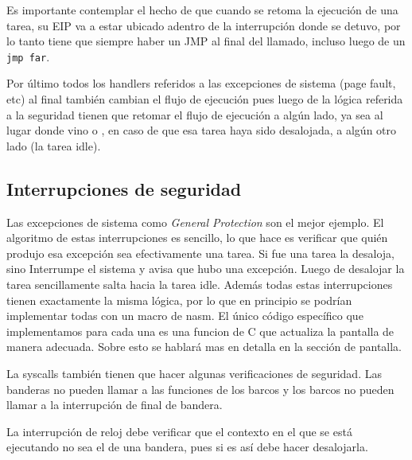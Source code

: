 	Es importante contemplar el hecho de que cuando se retoma la ejecución de una tarea, 
su EIP va a estar ubicado adentro de la interrupción donde se detuvo, por lo tanto tiene 
que siempre haber un JMP al final del llamado, incluso luego de un \texttt{jmp far}.
	
	Por último todos los handlers referidos a las excepciones de
sistema (page fault, etc) al final también cambian el flujo de ejecución
pues luego de la lógica referida a la seguridad tienen que retomar
el flujo de ejecución a algún lado, ya sea al lugar donde vino o
, en caso de que esa tarea haya sido desalojada, a algún otro lado
(la tarea idle).

\subsection{Interrupciones de seguridad}

	Las excepciones de sistema como \textit{General Protection}
son el mejor ejemplo. El algoritmo de estas interrupciones es
sencillo, lo que hace es verificar que quién produjo
esa excepción sea efectivamente una tarea. Si fue una tarea la desaloja, 
sino Interrumpe el sistema y avisa que hubo una excepción. Luego
de desalojar la tarea sencillamente salta hacia la tarea idle. Además
todas estas interrupciones tienen exactamente la misma lógica, por lo
que en principio se podrían implementar todas con un macro de nasm.
El único código específico que implementamos para cada una es una funcion de C
que actualiza la pantalla de manera adecuada. Sobre esto se hablará
mas en detalla en la sección de pantalla.

	La syscalls también tienen que hacer algunas verificaciones de
seguridad. Las banderas no pueden llamar a las funciones de los barcos
y los barcos no pueden llamar a la interrupción de final de bandera.

	La interrupción de reloj debe verificar que el contexto en el
que se está ejecutando no sea el de una bandera, pues si es así
debe hacer desalojarla. 



